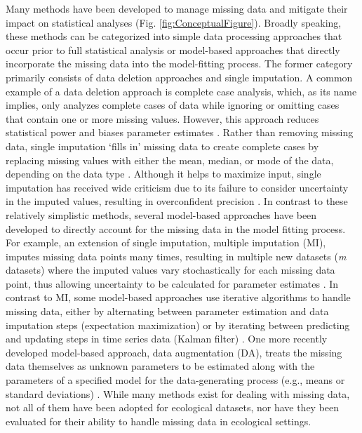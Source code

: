\documentclass{article}
\begin{document}
Many methods have been developed to manage missing data and mitigate their impact on statistical analyses (Fig. \ref{fig:ConceptualFigure}). Broadly speaking, these methods can be categorized into simple data processing approaches that occur prior to full statistical analysis or model-based approaches that directly incorporate the missing data into the model-fitting process. The former category primarily consists of data deletion approaches and single imputation. A common example of a data deletion approach is complete case analysis, which, as its name implies, only analyzes complete cases of data while ignoring or omitting cases that contain one or more missing values. However, this approach reduces statistical power and biases parameter estimates \citep{nakagawa_model_2011, aleryani2018dealing}. Rather than removing missing data, single imputation `fills in’ missing data to create complete cases \citep{nakagawa_model_2011} by replacing missing values with either the mean, median, or mode of the data, depending on the data type \citep{kang2013prevention, nakagawa_missing_2015, onkelinx_working_2017}. Although it helps to maximize input, single imputation has received wide criticism due to its failure to consider uncertainty in the imputed values, resulting in overconfident precision \citep{fichman2003multiple, nakagawa_model_2011, aleryani2018dealing}. In contrast to these relatively simplistic methods, several model-based approaches have been developed to directly account for the missing data in the model fitting process. For example, an extension of single imputation, multiple imputation (MI), imputes missing data points many times, resulting in multiple new datasets (\textit{m} datasets) where the imputed values vary stochastically for each missing data point, thus allowing uncertainty to be calculated for parameter estimates \citep{rubin1996multiple, rubin1988overview, nakagawa_model_2011, nakagawa_missing_2015}. In contrast to MI, some model-based approaches use iterative algorithms to handle missing data, either by alternating between parameter estimation and data imputation steps (expectation maximization) \citep{nadjafi2022expectation,li2019expectation, kang2013prevention} or by iterating between predicting and updating steps in time series data (Kalman filter) \citep{kalman_filter_1960}. One more recently developed model-based approach, data augmentation (DA), treats the missing data themselves as unknown parameters to be estimated along with the parameters of a specified model for the data-generating process (e.g., means or standard deviations) \citep{kong_sequential_1994}. While many methods exist for dealing with missing data, not all of them have been adopted for ecological datasets, nor have they been evaluated for their ability to handle missing data in ecological settings.
\end{document}
